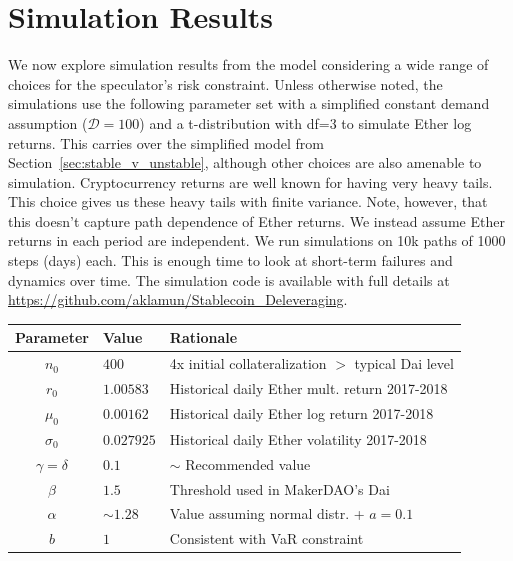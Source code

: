 \section{Simulation Results}\label{sec:simulations}

We now explore simulation results from the model considering a wide range of choices for the speculator's risk constraint. Unless otherwise noted, the simulations use the following parameter set with a simplified constant demand assumption ($\mathcal{D}=100$) and a t-distribution with df=3 to simulate Ether log returns. This carries over the simplified model from Section~\ref{sec:stable_v_unstable}, although other choices are also amenable to simulation. Cryptocurrency returns are well known for having very heavy tails. This choice gives us these heavy tails with finite variance. Note, however, that this doesn't capture path dependence of Ether returns. We instead assume Ether returns in each period are independent. We run simulations on 10k paths of 1000 steps (days) each. This is enough time to look at short-term failures and dynamics over time. The simulation code is available with full details at \url{https://github.com/aklamun/Stablecoin_Deleveraging}.

\begin{center}
	\begin{tabular}{c|l|l}
		\textbf{Parameter}	&	\textbf{Value}	& \textbf{Rationale} \\
		\hline
		$n_0$		&	$400$ 	&	4x initial collateralization $>$ typical Dai level \\
		$r_0$		&	$1.00583$	& Historical daily Ether mult. return 2017-2018 \\
		$\mu_0$		&	$0.00162$	& Historical daily Ether log return 2017-2018 \\
		$\sigma_0$	&	$0.027925$	& Historical daily Ether volatility 2017-2018 \\
		$\gamma=\delta$	&	$0.1$	& $\sim$ Recommended value \cite{longerstaey1996} \\
		$\beta$		&	$1.5$	& Threshold used in MakerDAO's Dai \\
		$\alpha$	&	$\sim 1.28$	& Value assuming normal distr. + $a=0.1$ \\
		$b$		&	$1$	& Consistent with VaR constraint \\
	\end{tabular}
\end{center}


